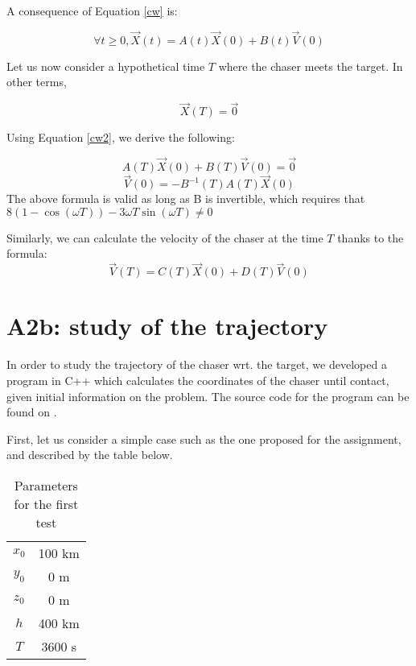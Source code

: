 \documentclass[journal]{IEEEtran}
\begin{document}
A consequence of Equation \ref{cw} is:

\begin{equation}
\label{cw2}
\forall t\geq 0, \vec{X}(t)=A(t)\vec{X}(0)+B(t)\vec{V}(0) 
\end{equation}

Let us now consider a hypothetical time $T$ where the chaser meets the target. In other terms,

\begin{equation}
    \vec{X}(T) = \vec{0}
\end{equation}

Using Equation \ref{cw2}, we derive the following:

\begin{equation}
    A(T)\vec{X}(0)+B(T)\vec{V}(0)=\vec{0}
\end{equation}
\begin{equation}
    \vec{V}(0)=-B^{-1}(T)A(T)\vec{X}(0) 
\end{equation}
The above formula is valid as long as B is invertible, which requires that $8(1-\cos{(\omega T)}) - 3 \omega T \sin{(\omega T)} \neq 0$


Similarly, we can calculate the velocity of the chaser at the time $T$ thanks to the formula:
\begin{equation}
    \vec{V}(T)=C(T)\vec{X}(0)+D(T)\vec{V}(0) 
\end{equation}

\section*{A2b: study of the trajectory}

In order to study the trajectory of the chaser wrt. the target, we developed a program in C++ which calculates the coordinates of the chaser until contact, given initial information on the problem. The source code for the program can be found on \cite{git_program}.

First, let us consider a simple case such as the one proposed for the assignment, and described by the table below.

\begin{table}[h!]
\centering
 \begin{tabular}{| c | c |} 
 \hline
 $x_0$ & 100 \si{km}\\
 $y_0$ & 0 \si{m}\\
 $z_0$ & 0 \si{m}\\
 $h$ & 400 \si{km} \\
 $T$ & 3600 \si{s}\\
 \hline
\end{tabular}
\caption{Parameters for the first test}
\end{table}
\end{document}
